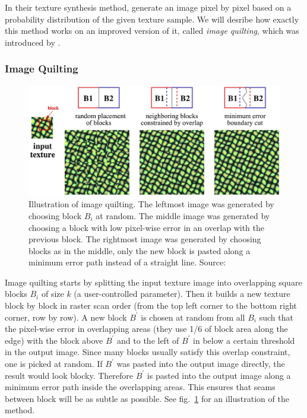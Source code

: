 In their texture synthesis method, \citet{Efros1999} generate an image pixel by pixel based on a probability distribution of the given texture sample. We will desribe how exactly this method works on an improved version of it, called \textit{image quilting}, which was introduced by \citet{Efros2001}.

\subsubsection{Image Quilting}
\label{section:background-texture_synthesis-patch_based-quilting}

\begin{figure}
    \centering
    \includegraphics[width=\textwidth]{images/02-quilting_method.jpg}
    \caption{Illustration of image quilting. The leftmost image was generated by choosing block \(B_i\) at random. The middle image was generated by choosing a block with low pixel-wise error in an overlap with the previous block. The rightmost image was generated by choosing blocks as in the middle, only the new block is pasted along a minimum error path instead of a straight line.  Source: \citet{Efros2001}}
    \label{fig:background_quilting_method}
\end{figure}

Image quilting starts by splitting the input texture image into overlapping square blocks \(B_i\) of size \(k\) (a user-controlled parameter). Then it builds a new texture block by block in raster scan order (from the top left corner to the bottom right corner, row by row). A new block \(B^{\prime}\) is chosen at random from all \(B_i\) such that the pixel-wise error in overlapping areas (they use 1/6 of block area along the edge) with the block above \(B^{\prime}\) and to the left of \(B^{\prime}\) in below a certain threshold in the output image. Since many blocks usually satisfy this overlap constraint, one is picked at random. If \(B^{\prime}\) was pasted into the output image directly, the result would look blocky. Therefore \(B^{\prime}\) is pasted into the output image along a minimum error path inside the overlapping areas. This ensures that seams between block will be as subtle as possible. See fig.~\ref{fig:background_quilting_method} for an illustration of the method.

